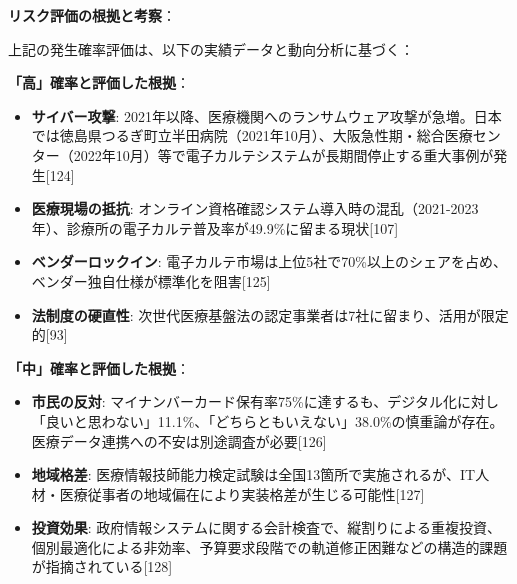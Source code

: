 \documentclass[
  a4paper,
  a4paper,
  11pt]{ltjsbook}
\providecommand{\tightlist}{%
  \setlength{\itemsep}{0pt}\setlength{\parskip}{0pt}}
\begin{document}
\begin{tcolorbox}[enhanced jigsaw, toprule=.15mm, bottomtitle=1mm, coltitle=black, left=2mm, opacityback=0, arc=.35mm, colbacktitle=quarto-callout-note-color!10!white, colback=white, opacitybacktitle=0.6, bottomrule=.15mm, rightrule=.15mm, breakable, title=\textcolor{quarto-callout-note-color}{\faInfo}\hspace{0.5em}{Note}, toptitle=1mm, titlerule=0mm, colframe=quarto-callout-note-color-frame, leftrule=.75mm]

\textbf{リスク評価の根拠と考察}：

上記の発生確率評価は、以下の実績データと動向分析に基づく：

\textbf{「高」確率と評価した根拠}：

\begin{itemize}
\tightlist
\item
  \textbf{サイバー攻撃}:
  2021年以降、医療機関へのランサムウェア攻撃が急増。日本では徳島県つるぎ町立半田病院（2021年10月）、大阪急性期・総合医療センター（2022年10月）等で電子カルテシステムが長期間停止する重大事例が発生{[}124{]}
\item
  \textbf{医療現場の抵抗}:
  オンライン資格確認システム導入時の混乱（2021-2023年）、診療所の電子カルテ普及率が49.9\%に留まる現状{[}107{]}
\item
  \textbf{ベンダーロックイン}:
  電子カルテ市場は上位5社で70\%以上のシェアを占め、ベンダー独自仕様が標準化を阻害{[}125{]}
\item
  \textbf{法制度の硬直性}:
  次世代医療基盤法の認定事業者は7社に留まり、活用が限定的{[}93{]}
\end{itemize}

\textbf{「中」確率と評価した根拠}：

\begin{itemize}
\tightlist
\item
  \textbf{市民の反対}:
  マイナンバーカード保有率75\%に達するも、デジタル化に対し「良いと思わない」11.1\%、「どちらともいえない」38.0\%の慎重論が存在。医療データ連携への不安は別途調査が必要{[}126{]}
\item
  \textbf{地域格差}:
  医療情報技師能力検定試験は全国13箇所で実施されるが、IT人材・医療従事者の地域偏在により実装格差が生じる可能性{[}127{]}
\item
  \textbf{投資効果}:
  政府情報システムに関する会計検査で、縦割りによる重複投資、個別最適化による非効率、予算要求段階での軌道修正困難などの構造的課題が指摘されている{[}128{]}
\end{itemize}


\end{tcolorbox}
\end{document}
